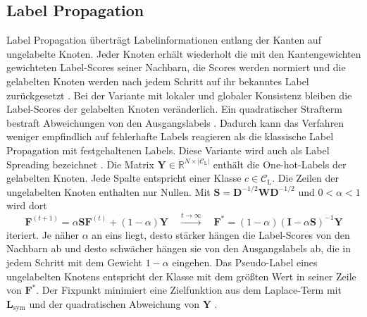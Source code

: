 \subsection{Label Propagation}
\label{sec:lp}

Label Propagation überträgt Labelinformationen entlang der Kanten auf ungelabelte Knoten. Jeder Knoten erhält wiederholt die mit den Kantengewichten gewichteten Label-Scores seiner Nachbarn, die Scores werden normiert und die gelabelten Knoten werden nach jedem Schritt auf ihr bekanntes Label zurückgesetzt \cite{zhu_learning_2002}. Bei der Variante mit lokaler und globaler Konsistenz bleiben die Label-Scores der gelabelten Knoten veränderlich. Ein quadratischer Strafterm bestraft Abweichungen von den Ausgangslabels \cite{zhou_learning_2003}. Dadurch kann das Verfahren weniger empfindlich auf fehlerhafte Labels reagieren als die klassische Label Propagation mit festgehaltenen Labels. Diese Variante wird auch als Label Spreading bezeichnet \cite{van_engelen_survey_2019,pedregosa_scikit-learn_2011}. Die Matrix $\bm{Y}\in\mathbb{R}^{N\times|\mathcal{C}_{\mathrm{L}}|}$ enthält die One-hot-Labels der gelabelten Knoten. Jede Spalte entspricht einer Klasse $c\in\mathcal{C}_{\mathrm{L}}$. Die Zeilen der ungelabelten Knoten enthalten nur Nullen. Mit $\bm{S}=\bm{D}^{-1/2}\bm{W}\bm{D}^{-1/2}$ und $0<\alpha<1$ wird dort \cite{zhou_learning_2003}
\begin{equation}
  \bm{F}^{(t+1)}=\alpha\bm{S}\bm{F}^{(t)}+(1-\alpha)\bm{Y}
  \quad\xrightarrow{t\to\infty}\quad
  \bm{F}^{*}=(1-\alpha)(\bm{I}-\alpha\bm{S})^{-1}\bm{Y}
  \label{eq:lp}
\end{equation}  
iteriert. Je näher $\alpha$ an eins liegt, desto stärker hängen die Label-Scores von den Nachbarn ab und desto schwächer hängen sie von den Ausgangslabels ab, die in jedem Schritt mit dem Gewicht $1-\alpha$ eingehen. Das Pseudo-Label eines ungelabelten Knotens entspricht der Klasse mit dem größten Wert in seiner Zeile von $\bm{F}^{*}$. Der Fixpunkt minimiert eine Zielfunktion aus dem Laplace-Term mit $\bm{L}_{\mathrm{sym}}$ und der quadratischen Abweichung von $\bm{Y}$ \cite{zhou_learning_2003}.

